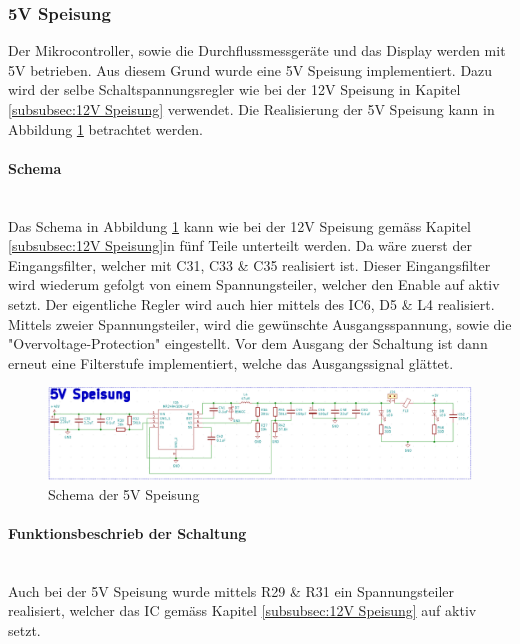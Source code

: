 \subsubsection{5V Speisung}
\label{subsubsec:5V Speisung}

Der Mikrocontroller, sowie die Durchflussmessgeräte und das Display  werden mit 5V betrieben. Aus diesem Grund wurde eine 5V Speisung implementiert. Dazu wird der selbe Schaltspannungsregler wie bei der 12V Speisung in Kapitel \ref{subsubsec:12V Speisung} verwendet. Die Realisierung der 5V Speisung kann in Abbildung \ref{fig:Schema_Speisung_5V} betrachtet werden.\\

\paragraph{Schema}\mbox{}\\

Das Schema in Abbildung \ref{fig:Schema_Speisung_5V} kann wie bei der 12V Speisung gemäss Kapitel \ref{subsubsec:12V Speisung}in fünf Teile unterteilt werden. Da wäre zuerst der Eingangsfilter, welcher mit C31, C33 \& C35 realisiert ist. Dieser Eingangsfilter wird wiederum gefolgt von einem Spannungsteiler, welcher den Enable auf aktiv setzt. Der eigentliche Regler wird auch hier mittels des IC6, D5 \& L4 realisiert. Mittels zweier Spannungsteiler, wird die gewünschte Ausgangsspannung, sowie die "Overvoltage-Protection" eingestellt. Vor dem Ausgang der Schaltung ist dann erneut eine Filterstufe implementiert, welche das Ausgangssignal glättet.

\begin{figure}[h!]
	\centering
	\includegraphics[width=\textwidth]{graphics/Schema_Speisung_5V.png}
	\caption{Schema der 5V Speisung}
	\label{fig:Schema_Speisung_5V}
\end{figure} 

\paragraph{Funktionsbeschrieb der Schaltung}\mbox{}\\

Auch bei der 5V Speisung wurde mittels R29 \& R31 ein Spannungsteiler realisiert, welcher das IC gemäss Kapitel \ref{subsubsec:12V Speisung} auf aktiv setzt.

